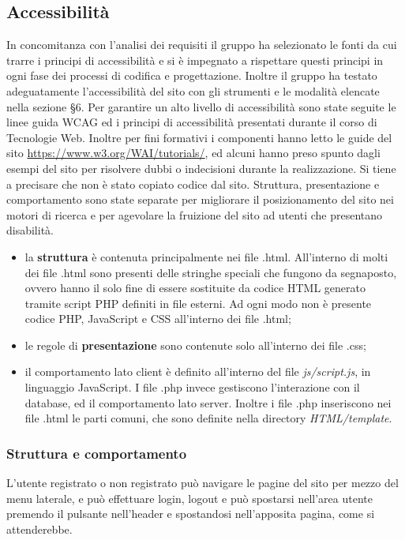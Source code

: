 \documentclass[12pt,a4paper,headings=optiontohead]{article}
\begin{document}
\subsection{Accessibilità}
In concomitanza con l'analisi dei requisiti il gruppo ha selezionato le fonti da cui trarre i principi di accessibilità e si è impegnato a rispettare questi principi in ogni fase dei processi di codifica e progettazione.
Inoltre il gruppo ha testato adeguatamente l'accessibilità del sito con gli strumenti e le modalità elencate nella sezione §6.
Per garantire un alto livello di accessibilità sono state seguite le linee guida WCAG ed i principi di accessibilità presentati durante il corso di Tecnologie Web. Inoltre per fini formativi i componenti hanno letto le guide del sito \url{https://www.w3.org/WAI/tutorials/}, ed alcuni hanno preso spunto dagli esempi del sito per risolvere dubbi o indecisioni durante la realizzazione. Si tiene a precisare che non è stato copiato codice dal sito.
Struttura, presentazione e comportamento sono state separate per migliorare il posizionamento del sito nei motori di ricerca e per agevolare la fruizione del sito ad utenti che presentano disabilità.

\begin{itemize}
	\item la \textbf{struttura} è contenuta principalmente nei file .html. All'interno di molti dei file .html sono presenti delle stringhe speciali che fungono da segnaposto, ovvero hanno il solo fine di essere sostituite da codice HTML generato tramite script PHP definiti in file esterni. Ad ogni modo non è presente codice PHP, JavaScript e CSS all'interno dei file .html;
	\item le regole di \textbf{presentazione} sono contenute solo all'interno dei file .css;
	\item il comportamento lato client è definito all'interno del file \textit{js/script.js}, in linguaggio JavaScript. I file .php invece gestiscono l'interazione con il database, ed il comportamento lato server. Inoltre i file .php inseriscono nei file .html le parti comuni, che sono definite nella directory \textit{HTML/template}.
\end{itemize}

\subsubsection{Struttura e comportamento}
L'utente registrato o non registrato può navigare le pagine del sito per mezzo del menu laterale, e può effettuare login, logout e può spostarsi nell'area utente premendo il pulsante nell'header e spostandosi nell'apposita pagina, come si attenderebbe.
\end{document}
